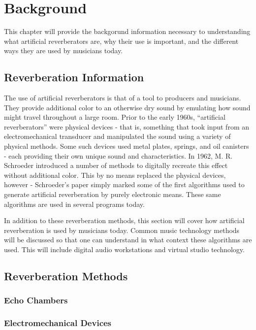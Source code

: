 \chapter{Background}
\hspace*{-0.155cm}This chapter will provide the backgorund information necessary to understanding what artificial reverberators are, why their use is important, and the different ways they are used by musicians today.

\section{Reverberation Information}
The use of artificial reverberators is that of a tool to producers and musicians. They provide additional color to an otherwise dry sound by emulating how sound might travel throughout a large room. Prior to the early 1960s, ``artificial reverberators'' were physical devices - that is, something that took input from an electromechanical transducer and manipulated the sound using a variety of physical methods. Some such devices used metal plates, springs, and oil canisters - each providing their own unique sound and characteristics. In 1962, M. R. Schroeder introduced a number of methods to digitally recreate this effect without additional color. This by no means replaced the physical devices, however - Schroeder's paper simply marked some of the first algorithms used to generate artificial reverberation by purely electronic means. These same algorithms are used in several programs today.

In addition to these reverberation methods, this section will cover how artificial reverberation is used by musicians today. Common music technology methods will be discussed so that one can understand in what context these algorithms are used. This will include digital audio workstations and virtual studio technology.

\section{Reverberation Methods}

\subsection{Echo Chambers}

\subsection{Electromechanical Devices}
